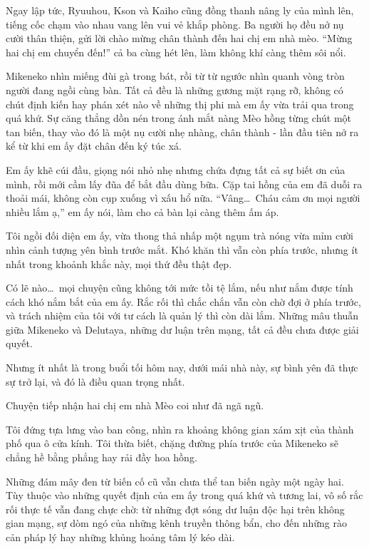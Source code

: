 ﻿\documentclass[../main.tex]{subfiles}
\begin{document}
Ngay lập tức, Ryuuhou, Kson và Kaiho cũng đồng thanh nâng ly của mình lên, tiếng cốc chạm vào nhau vang lên vui vẻ khắp phòng. Ba người họ đều nở nụ cười thân thiện, gửi lời chào mừng chân thành đến hai chị em nhà mèo. ``Mừng hai chị em chuyển đến!'' cả ba cùng hét lên, làm không khí càng thêm sôi nổi.

Mikeneko nhìn miếng đùi gà trong bát, rồi từ từ ngước nhìn quanh vòng tròn người đang ngồi cùng bàn. Tất cả đều là những gương mặt rạng rỡ, không có chút định kiến hay phán xét nào về những thị phi mà em ấy vừa trải qua trong quá khứ. Sự căng thẳng dồn nén trong ánh mắt nàng Mèo hồng từng chút một tan biến, thay vào đó là một nụ cười nhẹ nhàng, chân thành - lần đầu tiên nở ra kể từ khi em ấy đặt chân đến ký túc xá.

Em ấy khẽ cúi đầu, giọng nói nhỏ nhẹ nhưng chứa đựng tất cả sự biết ơn của mình, rồi mới cầm lấy đũa để bắt đầu dùng bữa. Cặp tai hồng của em đã duỗi ra thoải mái, không còn cụp xuống vì xấu hổ nữa. ``Vâng\dots\ Cháu cảm ơn mọi người nhiều lắm ạ,'' em ấy nói, làm cho cả bàn lại càng thêm ấm áp.

Tôi ngồi đối diện em ấy, vừa thong thả nhấp một ngụm trà nóng vừa mỉm cười nhìn cảnh tượng yên bình trước mắt. Khó khăn thì vẫn còn phía trước, nhưng ít nhất trong khoảnh khắc này, mọi thứ đều thật đẹp.

Có lẽ nào\dots\ mọi chuyện cũng không tới mức tồi tệ lắm, nếu như nắm được tính cách khó nắm bắt của em ấy. Rắc rối thì chắc chắn vẫn còn chờ đợi ở phía trước, và trách nhiệm của tôi với tư cách là quản lý thì còn dài lắm. Những mâu thuẫn giữa Mikeneko và Delutaya, những dư luận trên mạng, tất cả đều chưa được giải quyết.

Nhưng ít nhất là trong buổi tối hôm nay, dưới mái nhà này, sự bình yên đã thực sự trở lại, và đó là điều quan trọng nhất.

\il

Chuyện tiếp nhận hai chị em nhà Mèo coi như đã ngã ngũ.

Tôi đứng tựa lưng vào ban công, nhìn ra khoảng không gian xám xịt của thành phố qua ô cửa kính. Tôi thừa biết, chặng đường phía trước của Mikeneko sẽ chẳng hề bằng phẳng hay rải đầy hoa hồng.

Những đám mây đen từ biến cố cũ vẫn chưa thể tan biến ngày một ngày hai. Tùy thuộc vào những quyết định của em ấy trong quá khứ và tương lai, vô số rắc rối thực tế vẫn đang chực chờ: từ những đợt sóng dư luận độc hại trên không gian mạng, sự dòm ngó của những kênh truyền thông bẩn, cho đến những rào cản pháp lý hay những khủng hoảng tâm lý kéo dài.
\end{document}
